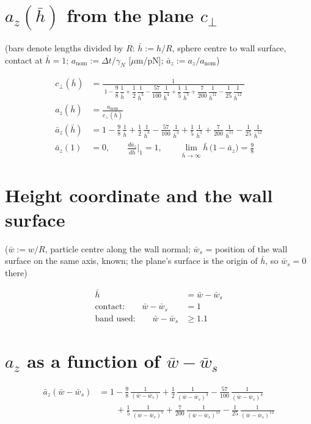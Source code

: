 \documentclass[11pt,a4paper,fontset=none]{ctexart}
\newcommand{\ba}{\bar{a}}
\newcommand{\bw}{\bar{w}}
\newcommand{\bh}{\bar{h}}
\newcommand{\gs}{(\bw - \bw_s)}
\begin{document}
\section{$a_z(\bh)$ from the plane $c_\perp$}

(bars denote lengths divided by $R$: $\bh := h/R$, sphere centre to wall surface, contact at $\bh = 1$;
$a_{\mathrm{nom}} := \Delta t/\gamma_N$ [$\mu$m/pN]; $\ba_z := a_z/a_{\mathrm{nom}}$)

\begin{align*}
c_\perp(\bh)
  &= \frac{1}{\;1 - \dfrac{9}{8}\,\dfrac{1}{\bh}
       + \dfrac{1}{2}\,\dfrac{1}{\bh^{3}}
       - \dfrac{57}{100}\,\dfrac{1}{\bh^{4}}
       + \dfrac{1}{5}\,\dfrac{1}{\bh^{5}}
       + \dfrac{7}{200}\,\dfrac{1}{\bh^{11}}
       - \dfrac{1}{25}\,\dfrac{1}{\bh^{12}}\;} \\[4pt]
a_z(\bh)
  &= \frac{a_{\mathrm{nom}}}{c_\perp(\bh)} \\[4pt]
\ba_z(\bh)
  &= 1 - \frac{9}{8}\,\frac{1}{\bh}
       + \frac{1}{2}\,\frac{1}{\bh^{3}}
       - \frac{57}{100}\,\frac{1}{\bh^{4}}
       + \frac{1}{5}\,\frac{1}{\bh^{5}}
       + \frac{7}{200}\,\frac{1}{\bh^{11}}
       - \frac{1}{25}\,\frac{1}{\bh^{12}} \\[4pt]
\ba_z(1) &= 0, \qquad \frac{d\ba_z}{d\bh}\Big|_{1} = 1, \qquad
\lim_{\bh\to\infty} \bh\,\bigl(1 - \ba_z\bigr) = \frac{9}{8}
\end{align*}

\section{Height coordinate and the wall surface}

($\bw := w/R$, particle centre along the wall normal; $\bw_s$ = position of the wall surface on the same axis, known;
the plane's surface is the origin of $\bh$, so $\bw_s = 0$ there)

\begin{align*}
\bh          &= \bw - \bw_s \\
\text{contact:}\qquad \bw - \bw_s &= 1 \\
\text{band used:}\qquad \bw - \bw_s &\ge 1.1
\end{align*}

\section{$a_z$ as a function of $\bw - \bw_s$}

\begin{align*}
\ba_z\gs
   &= 1 - \frac{9}{8}\,\frac{1}{\gs}
       + \frac{1}{2}\,\frac{1}{\gs^{3}}
       - \frac{57}{100}\,\frac{1}{\gs^{4}} \\
&\qquad
       + \frac{1}{5}\,\frac{1}{\gs^{5}}
       + \frac{7}{200}\,\frac{1}{\gs^{11}}
       - \frac{1}{25}\,\frac{1}{\gs^{12}}
\end{align*}
\end{document}
